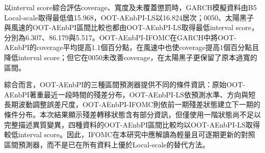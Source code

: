 以interval score綜合評估coverage、寬度及未覆蓋懲罰時，GARCH模擬資料由B5 Local-scale取得最低值15.968，OOT-AEnbPI-LS以16.824居次；0050、太陽黑子與風速的OOT-AEnbPI區間比較也都由OOT-AEnbPI-LS取得最低interval score，分別為6.307、86.179與5.517。OOT-AEnbPI-IFOMC在GARCH中將OOT-AEnbPI的coverage平均提高1.1個百分點，在風速中也使coverage提高1個百分點且降低interval score；但它在0050未改善coverage，在太陽黑子更保留了原本過寬的區間。

綜合而言，OOT-AEnbPI的三種區間預測器提供不同的條件資訊：原始OOT-AEnbPI著重最近一段時間的殘差分布，OOT-AEnbPI-LS依預測水準、方向與短長期波動調整誤差尺度，OOT-AEnbPI-IFOMC則依前一期殘差狀態建立下一期的條件分布。本次結果顯示殘差轉移狀態含有部分資訊，但僅使用一階狀態尚不足以完整描述異質變異，四種資料的OOT-AEnbPI區間比較均以OOT-AEnbPI-LS取得較低interval score。因此，IFOMC在本研究中應解讀為輕量且可逐期更新的對照區間預測器，而不是已在所有資料上優於Local-scale的替代方法。
